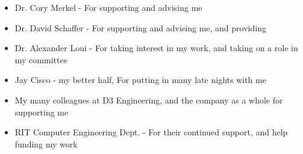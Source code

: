 %
%
%


\frontmatter


\begin{acknowledgments}
\begin{itemize}
    \item Dr. Cory Merkel - For supporting and advising me
    \item Dr. David Schaffer - For supporting and advising me, and providing 
    \item Dr. Alexander Loui - For taking interest in my work, and taking on a role in my committee 
    \item Jay Cisco - my better half, For putting in many late nights with me
    \item My many colleagues at D3 Engineering, and the company as a whole for supporting me
    \item RIT Computer Engineering Dept. - For their continued support, and help funding my work
\end{itemize}
\end{acknowledgments} 


\begin{dedication}
\end{dedication}


